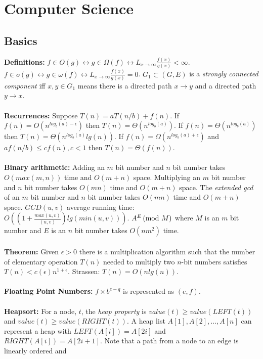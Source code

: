 \chapter{Computer Science}
\section{Basics}
{\bf Definitions:}
$f \in O(g) \leftrightarrow
g \in \Omega (f) \leftrightarrow
L_{x \rightarrow \infty} {\frac {f(x)} {g(x)}} < \infty$.
$f \in o(g) \leftrightarrow
g \in \omega (f) \leftrightarrow
L_{x \rightarrow \infty} {\frac {f(x)} {g(x)}} = 0 $.  $G_1 \subset (G,E)$ is a
\emph{strongly connected component} iff $x,y \in G_1$ means there is a directed path
$x \rightarrow y$ and a directed path $y \rightarrow x$.
\\
\\
{\bf Recurrences:}  Suppose $T(n)= aT(n/b) + f(n)$.  
If $f(n)= O(n^{log_b(a)-\epsilon})$ then $T(n)= \Theta(n^{log_b(a)})$.
If $f(n)= \Theta(n^{log_b(a)})$ then $T(n)= \Theta(n^{log_b(a)}lg(n))$.
If $f(n)= \Omega(n^{log_b(a)+\epsilon})$ and $af(n/b) \le c f(n), c<1$
then $T(n)= \Theta(f(n))$.\\
\\
{\bf Binary arithmetic:}
Adding an $m$ bit number and $n$ bit number takes $O(max(m,n))$ time and $O(m+n)$ space.
Multiplying an $m$ bit number and $n$ bit number takes $O(mn)$ time and $O(m+n)$ space.
The \emph{extended gcd} of an $m$ bit number and $n$ bit number takes 
$O(mn)$ time and $O(m+n)$ space.
$GCD(u, v)$ average running time:
$O((1+{\frac {max(u,v)} {(u,v)}}) lg(min(u, v)))$.
$A^E \thinspace \textnormal{(mod } M \textnormal{)}$ where $M$ is an $m$ bit number and $E$ is an $n$ bit number 
takes $O(n m^2)$ time. 
\\
\\
{\bf Theorem:}
Given $\epsilon>0$ there is a multiplication algorithm such that the number
of elementary operation $T(n)$ needed to multiply two $n$-bit numbers
satisfies
$T(n) <c(\epsilon)n^{1+\epsilon}$.  Strassen: $T(n)=O(n lg(n))$.
\\
\\
{\bf Floating Point Numbers:} $f \times b^{e-q}$ is represented as $(e, f)$.
\\
\\
{\bf Heapsort:} For a node, $t$, the \emph{heap property} is
$value(t) \geq value(LEFT(t))$ and $value(t) \geq value(RIGHT(t))$.  
A heap list $A[1], A[2] , \ldots, A[n]$ can represent a heap with 
$LEFT(A[i])= A[2i]$ and $RIGHT(A[i])= A[2i+1]$.  Note that a path 
from a node to an edge is linearly ordered and
